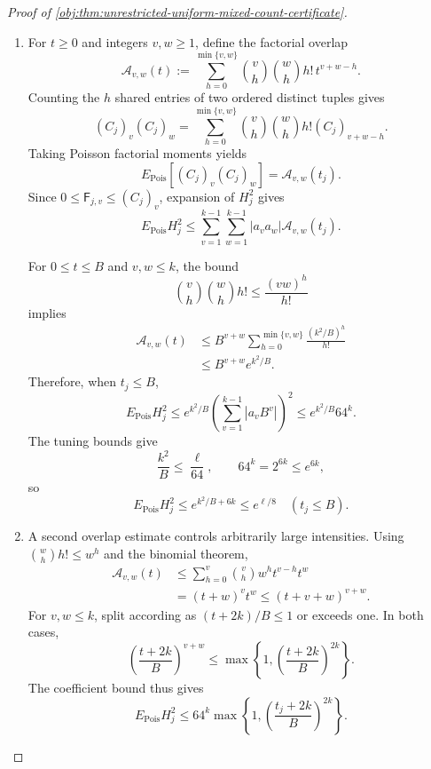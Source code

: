 \documentclass[11pt]{article}
\begin{document}
\begin{proof}[Proof of \cref{obj:thm:unrestricted-uniform-mixed-count-certificate}]
\begin{enumerate}
\item For \(t\ge0\) and integers \(v,w\ge1\), define the factorial overlap
\[
\mathcal A_{v,w}(t)
:=
\sum_{h=0}^{\min\{v,w\}}
\binom vh\binom wh h!\,t^{v+w-h}.
\]
Counting the \(h\) shared entries of two ordered distinct tuples gives
\[
(C_j)_v(C_j)_w
=
\sum_{h=0}^{\min\{v,w\}}
\binom vh\binom wh h!(C_j)_{v+w-h}.
\]
Taking Poisson factorial moments yields
\[
E_{\mathrm{Pois}}[(C_j)_v(C_j)_w]
=\mathcal A_{v,w}(t_j).
\]
Since \(0\le\mathsf F_{j,v}\le(C_j)_v\), expansion of \(H_j^2\) gives
\[
E_{\mathrm{Pois}}H_j^2
\le
\sum_{v=1}^{k-1}\sum_{w=1}^{k-1}
|a_va_w|\mathcal A_{v,w}(t_j).
\]

For \(0\le t\le B\) and \(v,w\le k\), the bound
\[
\binom vh\binom wh h!\le\frac{(vw)^h}{h!}
\]
implies
\[
\begin{aligned}
\mathcal A_{v,w}(t)
&\le B^{v+w}
\sum_{h=0}^{\min\{v,w\}}
\frac{(k^2/B)^h}{h!}\\
&\le B^{v+w}e^{k^2/B}.
\end{aligned}
\]
Therefore, when \(t_j\le B\),
\[
E_{\mathrm{Pois}}H_j^2
\le e^{k^2/B}
\left(\sum_{v=1}^{k-1}|a_vB^v|\right)^2
\le e^{k^2/B}64^k.
\]
The tuning bounds give
\[
\frac{k^2}{B}\le\frac{\ell}{64},
\qquad 64^k=2^{6k}\le e^{6k},
\]
so
\[
E_{\mathrm{Pois}}H_j^2
\le e^{k^2/B+6k}\le e^{\ell/8}
\quad(t_j\le B).
\]

\item A second overlap estimate controls arbitrarily large intensities.
Using \(\binom whh!\le w^h\) and the binomial theorem,
\[
\begin{aligned}
\mathcal A_{v,w}(t)
&\le
\sum_{h=0}^{v}\binom vh w^h t^{v-h}t^w\\
&=(t+w)^vt^w
\le(t+v+w)^{v+w}.
\end{aligned}
\]
For \(v,w\le k\), split according as \((t+2k)/B\le1\) or exceeds one.
In both cases,
\[
\left(\frac{t+2k}{B}\right)^{v+w}
\le
\max\left\{1,\left(\frac{t+2k}{B}\right)^{2k}\right\}.
\]
The coefficient bound thus gives
\[
E_{\mathrm{Pois}}H_j^2
\le64^k
\max\left\{1,
\left(\frac{t_j+2k}{B}\right)^{2k}\right\}.
\]


\end{enumerate}
\end{proof}
\end{document}
